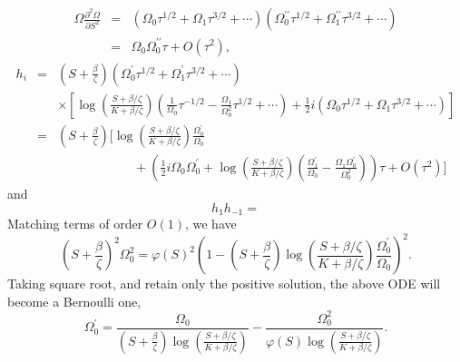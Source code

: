 \documentclass[12pt]{article}
\begin{document}
    \begin{eqnarray}
      \Omega\frac{\partial^2 \Omega}{\partial S^2} &=& \left(\Omega_0\tau^{1/2}+\Omega_1\tau^{3/2}+\cdots\right)
                                                     \left(\Omega_0^{\prime\prime}\tau^{1/2}
                                                     +\Omega_1^{\prime\prime}\tau^{3/2}+\cdots\right)\nonumber\\
                                                 &=& \Omega_0\Omega_0^{\prime\prime}\tau + O(\tau^2),
    \end{eqnarray}
    \begin{eqnarray}
      h_i &=& \left(S+\frac{\beta}{\zeta}\right)\left(\Omega_0^{\prime}\tau^{1/2}+\Omega_1^{\prime}\tau^{3/2}+\cdots\right) \nonumber\\
          && \times\left[\log\left(\frac{S+\beta / \zeta}{K+\beta / \zeta}\right)
                         \left(\frac{1}{\Omega_0}\tau^{-1/2}-\frac{\Omega_1}{\Omega_0^2}\tau^{1/2}+\cdots\right)
                         +\frac{1}{2}i\left(\Omega_0\tau^{1/2}+\Omega_1\tau^{3/2}+\cdots\right)\right] \nonumber\\
          &=& \left(S+\frac{\beta}{\zeta}\right)\Bigg[\log\left(\frac{S+\beta / \zeta}{K+\beta / \zeta}\right)
                                                      \frac{\Omega_0^{\prime}}{\Omega_0}\nonumber\\
          && \quad\quad\quad\quad\quad\quad +\left(\frac{1}{2}i\Omega_0\Omega_0^{\prime}
                                   +\log\left(\frac{S+\beta / \zeta}{K+\beta / \zeta}\right)
                                    \left(\frac{\Omega_1^{\prime}}{\Omega_0}-\frac{\Omega_1\Omega_0^{\prime}}{\Omega_0^2}\right)\right)\tau
                                   +O(\tau^2)\Bigg]
    \end{eqnarray}
    and
    \begin{equation}
      h_1h_{-1} =
    \end{equation}
    Matching terms of order $O(1)$, we have
    \begin{equation}
      \left(S+\frac{\beta}{\zeta}\right)^2\Omega_0^2 =
      \varphi(S)^2\left(1-\left(S+\frac{\beta}{\zeta}\right)\log\left(\frac{S+\beta / \zeta}{K+\beta / \zeta}\right)
      \frac{\Omega_0^{\prime}}{\Omega_0}\right)^2.
    \end{equation}
    Taking square root, and retain only the positive solution, the above ODE will become a Bernoulli one,
    \begin{equation}
      \Omega_0^{\prime} = \frac{\Omega_0}{\left(S+\frac{\beta}{\zeta}\right)\log\left(\frac{S+\beta / \zeta}{K+\beta / \zeta}\right)}
                        - \frac{\Omega_0^2}{\varphi(S)\log\left(\frac{S+\beta / \zeta}{K+\beta / \zeta}\right)}.
    \end{equation}
\end{document}
